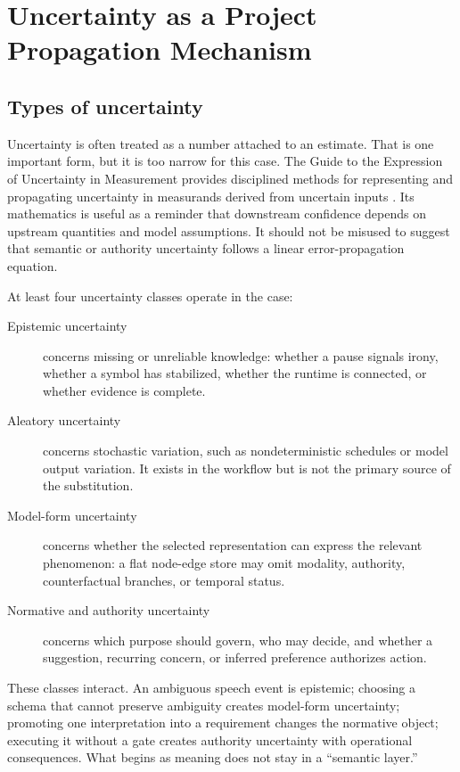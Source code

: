 \documentclass[10pt,a4paper]{article}
\begin{document}
\section{Uncertainty as a Project Propagation Mechanism}

\subsection{Types of uncertainty}

Uncertainty is often treated as a number attached to an estimate. That is one important form, but it is too narrow for this case. The Guide to the Expression of Uncertainty in Measurement provides disciplined methods for representing and propagating uncertainty in measurands derived from uncertain inputs \cite{gum2008}. Its mathematics is useful as a reminder that downstream confidence depends on upstream quantities and model assumptions. It should not be misused to suggest that semantic or authority uncertainty follows a linear error-propagation equation.

At least four uncertainty classes operate in the case:

\begin{description}
  \item[Epistemic uncertainty] concerns missing or unreliable knowledge: whether a pause signals irony, whether a symbol has stabilized, whether the runtime is connected, or whether evidence is complete.
  \item[Aleatory uncertainty] concerns stochastic variation, such as nondeterministic schedules or model output variation. It exists in the workflow but is not the primary source of the substitution.
  \item[Model-form uncertainty] concerns whether the selected representation can express the relevant phenomenon: a flat node-edge store may omit modality, authority, counterfactual branches, or temporal status.
  \item[Normative and authority uncertainty] concerns which purpose should govern, who may decide, and whether a suggestion, recurring concern, or inferred preference authorizes action.
\end{description}

These classes interact. An ambiguous speech event is epistemic; choosing a schema that cannot preserve ambiguity creates model-form uncertainty; promoting one interpretation into a requirement changes the normative object; executing it without a gate creates authority uncertainty with operational consequences. What begins as meaning does not stay in a ``semantic layer.''
\end{document}
